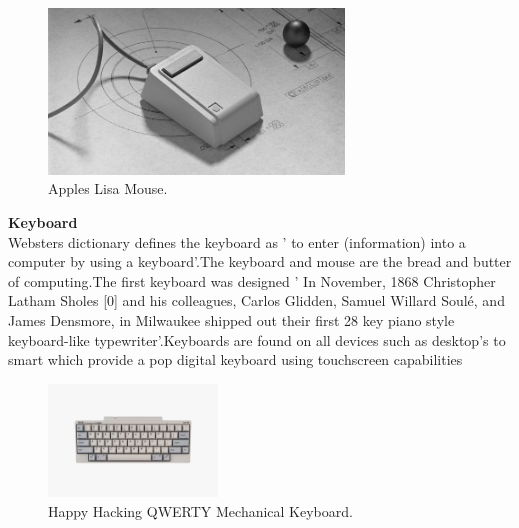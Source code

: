 \begin{figure}[h!]
  \centering
    \includegraphics[width=0.7\textwidth]{Research-Latex/images/mouseImage.jpg}
     \caption{Apples Lisa Mouse.}
\end{figure}












\textbf{Keyboard}\\
Websters dictionary defines the keyboard as ' to enter (information) into a computer by using a keyboard'.The keyboard and mouse are the bread and butter of computing.The first keyboard was designed ' In November, 1868 Christopher Latham Sholes [0] and his colleagues, Carlos Glidden, Samuel Willard Soulé, and James Densmore, in Milwaukee shipped out their first 28 key piano style keyboard-like typewriter'.Keyboards are found on all devices such as desktop's to smart which provide a pop digital keyboard using touchscreen capabilities


\begin{figure}[h!]
  \centering
    \includegraphics[width=0.4\textwidth]{Research-Latex/images/keyboard.jpeg}
     \caption{Happy Hacking QWERTY Mechanical Keyboard.}
\end{figure}























